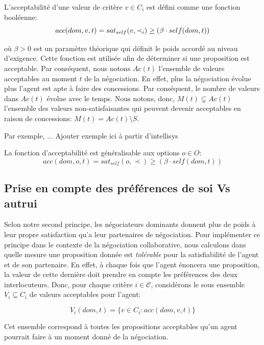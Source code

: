 	L'acceptabilité d'une valeur de critère $v \in C_i$ est défini comme une fonction booléenne:
	\begin{equation}
	\vspace{0.5em}
	acc(dom,v, t) = sat_{self}(v, \prec_i) \geq  (\beta \cdot self(dom,t))
	\end{equation}
	
	\medskip
	où $\beta>0$ est un paramètre théorique qui définit le poids accordé au niveau d'exigence. Cette fonction est utilisée afin de déterminer si une proposition est acceptable. Par conséquent, nous notons $Ac(t)$ l'ensemble de valeurs acceptables au moment $t$ de la négociation. En effet, plus la négociation évolue plus l'agent est apte à faire des concessions. Par conséquent, le nombre de valeurs dans $Ac(t)$ évolue avec le temps. 
	Nous notons, donc, $M(t)\subsetneq Ac(t)$ l'ensemble des valeurs non-satisfaisantes qui peuvent devenir acceptables en raison de concessions: $M(t)=Ac(t)\setminus S$.
	
	Par exemple, ...	Ajouter exemple ici à partir d'intellisys
	
	La fonction d'acceptabilité est généralisable aux options $o \in O$:
	 $$acc(dom,o, t) = sat_{self}(o, \prec) \geq  (\beta \cdot self(dom,t))$$

	

	
	
	\subsection {Prise en compte des préférences de soi Vs autrui}
	Selon notre second principe, les négociateurs dominants donnent plus de poids à leur propre satisfaction qu'a leur partenaires de négociation. 
	Pour implémenter ce principe dans le contexte de la négociation collaborative, nous calculons dans quelle mesure une proposition donnée est \emph{tolérable} pour la satisfiabilité de l'agent et de son partenaire.
	En effet, à chaque fois que l'agent énoncera une proposition, la valeur de cette dernière doit prendre en compte les préférences des deux interlocuteurs. 
	Donc, pour chaque critère $i\in\mathcal{C}$, considérons le sous ensemble $V_i\subseteq C_i$ de valeurs acceptables pour l'agent:

	\begin{equation}
	V_i(dom,t) = \{ v\in C_i : acc(dom,v,t) \}
	\end{equation}
	
	Cet ensemble correspond à toutes les propositions acceptables qu'un agent pourrait faire à un moment donné de la négociation.
	
